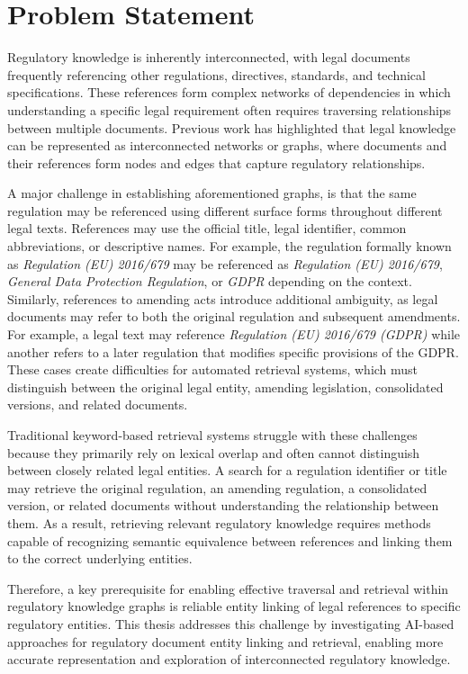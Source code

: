 \section{Problem Statement}

Regulatory knowledge is inherently interconnected, with legal documents frequently referencing other regulations, directives, standards, and technical specifications. These references form complex networks of dependencies in which understanding a specific legal requirement often requires traversing relationships between multiple documents. Previous work has highlighted that legal knowledge can be represented as interconnected networks or graphs, where documents and their references form nodes and edges that capture regulatory relationships.

A major challenge in establishing aforementioned graphs, is that the same regulation may be referenced using different surface forms throughout different legal texts. References may use the official title, legal identifier, common abbreviations, or descriptive names. For example, the regulation formally known as \textit{Regulation (EU) 2016/679} may be referenced as \textit{Regulation (EU) 2016/679}, \textit{General Data Protection Regulation}, or \textit{GDPR} depending on the context. Similarly, references to amending acts introduce additional ambiguity, as legal documents may refer to both the original regulation and subsequent amendments. For example, a legal text may reference \textit{Regulation (EU) 2016/679 (GDPR)} while another refers to a later regulation that modifies specific provisions of the GDPR. These cases create difficulties for automated retrieval systems, which must distinguish between the original legal entity, amending legislation, consolidated versions, and related documents.

Traditional keyword-based retrieval systems struggle with these challenges because they primarily rely on lexical overlap and often cannot distinguish between closely related legal entities. A search for a regulation identifier or title may retrieve the original regulation, an amending regulation, a consolidated version, or related documents without understanding the relationship between them. As a result, retrieving relevant regulatory knowledge requires methods capable of recognizing semantic equivalence between references and linking them to the correct underlying entities.

Therefore, a key prerequisite for enabling effective traversal and retrieval within regulatory knowledge graphs is reliable entity linking of legal references to specific regulatory entities. This thesis addresses this challenge by investigating AI-based approaches for regulatory document entity linking and retrieval, enabling more accurate representation and exploration of interconnected regulatory knowledge.
